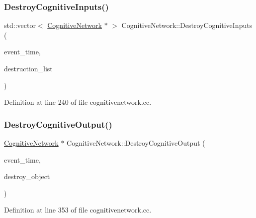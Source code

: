 \subsubsection{\texorpdfstring{Destroy\+Cognitive\+Inputs()}{DestroyCognitiveInputs()}}
{\footnotesize\ttfamily std\+::vector$<$ \mbox{\hyperlink{class_cognitive_network}{Cognitive\+Network}} $\ast$ $>$ Cognitive\+Network\+::\+Destroy\+Cognitive\+Inputs (\begin{DoxyParamCaption}\item[{std\+::chrono\+::time\+\_\+point$<$ \mbox{\hyperlink{universe_8h_a0ef8d951d1ca5ab3cfaf7ab4c7a6fd80}{Clock}} $>$}]{event\+\_\+time,  }\item[{std\+::vector$<$ \mbox{\hyperlink{class_cognitive_network}{Cognitive\+Network}} $\ast$$>$}]{destruction\+\_\+list }\end{DoxyParamCaption})}



Definition at line 240 of file cognitivenetwork.\+cc.

\mbox{\label{class_cognitive_network_a8475cf7277d25532bb31926e768600e8}} 
\subsubsection{\texorpdfstring{Destroy\+Cognitive\+Output()}{DestroyCognitiveOutput()}}
{\footnotesize\ttfamily \mbox{\hyperlink{class_cognitive_network}{Cognitive\+Network}} $\ast$ Cognitive\+Network\+::\+Destroy\+Cognitive\+Output (\begin{DoxyParamCaption}\item[{std\+::chrono\+::time\+\_\+point$<$ \mbox{\hyperlink{universe_8h_a0ef8d951d1ca5ab3cfaf7ab4c7a6fd80}{Clock}} $>$}]{event\+\_\+time,  }\item[{\mbox{\hyperlink{class_cognitive_network}{Cognitive\+Network}} $\ast$}]{destroy\+\_\+object }\end{DoxyParamCaption})}



Definition at line 353 of file cognitivenetwork.\+cc.

\mbox{\label{class_cognitive_network_ad08191cbab02f26f69d25bc7e6b5c1ee}} 
